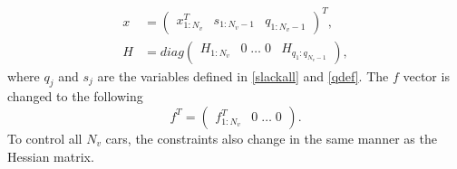\documentclass[letterpaper,10pt,conference]{ieeeconf}
\begin{document}
\begin{align}
x &=\begin{pmatrix}
x_{1:N_v}^T & s_{1:N_v-1} & q_{1:N_v-1}
\end{pmatrix}^T,\label{xvec}\\
H &= diag\begin{pmatrix}H_{1:N_v}&0 \; \dots \; 0 & H_{q_1:q_{N_v-1}}\end{pmatrix},
\end{align}
where $q_j$ and $s_j$ are the variables defined in \eqref{slackall} and \eqref{qdef}. The $f$ vector is changed to the following
\begin{equation}
f^T = 
\begin{pmatrix}
f^T_{1:N_v} & 0 \; \dots \; 0
\end{pmatrix}.
\end{equation}
To control all $N_v$ cars, the constraints also change in the same manner as the Hessian matrix.
\end{document}
